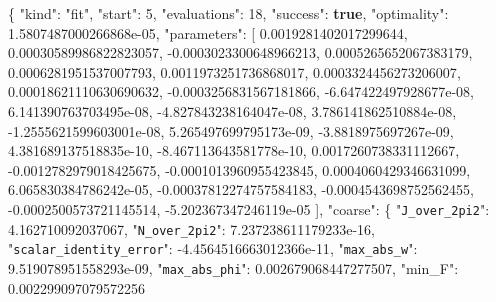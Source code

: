 \documentclass[
  10pt,
]{article}
\newenvironment{Shaded}{}{}
\newcommand{\DataTypeTok}[1]{\textcolor[rgb]{0.56,0.13,0.00}{#1}}
\newcommand{\DecValTok}[1]{\textcolor[rgb]{0.25,0.63,0.44}{#1}}
\newcommand{\FloatTok}[1]{\textcolor[rgb]{0.25,0.63,0.44}{#1}}
\newcommand{\FunctionTok}[1]{\textcolor[rgb]{0.02,0.16,0.49}{#1}}
\newcommand{\KeywordTok}[1]{\textcolor[rgb]{0.00,0.44,0.13}{\textbf{#1}}}
\newcommand{\OtherTok}[1]{\textcolor[rgb]{0.00,0.44,0.13}{#1}}
\newcommand{\StringTok}[1]{\textcolor[rgb]{0.25,0.44,0.63}{#1}}
\begin{document}
\begin{Shaded}
\begin{Highlighting}[]
\FunctionTok{\{}
  \DataTypeTok{"kind"}\FunctionTok{:} \StringTok{"fit"}\FunctionTok{,}
  \DataTypeTok{"start"}\FunctionTok{:} \DecValTok{5}\FunctionTok{,}
  \DataTypeTok{"evaluations"}\FunctionTok{:} \DecValTok{18}\FunctionTok{,}
  \DataTypeTok{"success"}\FunctionTok{:} \KeywordTok{true}\FunctionTok{,}
  \DataTypeTok{"optimality"}\FunctionTok{:} \FloatTok{1.5807487000266868e{-}05}\FunctionTok{,}
  \DataTypeTok{"parameters"}\FunctionTok{:} \OtherTok{[}
    \FloatTok{0.0019281402017299644}\OtherTok{,}
    \FloatTok{0.00030589986822823057}\OtherTok{,}
    \FloatTok{{-}0.0003023300648966213}\OtherTok{,}
    \FloatTok{0.0005265652067383179}\OtherTok{,}
    \FloatTok{0.0006281951537007793}\OtherTok{,}
    \FloatTok{0.0011973251736868017}\OtherTok{,}
    \FloatTok{0.0003324456273206007}\OtherTok{,}
    \FloatTok{0.00018621110630690632}\OtherTok{,}
    \FloatTok{{-}0.0003256831567181866}\OtherTok{,}
    \FloatTok{{-}6.647422497928677e{-}08}\OtherTok{,}
    \FloatTok{6.141390763703495e{-}08}\OtherTok{,}
    \FloatTok{{-}4.827843238164047e{-}08}\OtherTok{,}
    \FloatTok{3.786141862510884e{-}08}\OtherTok{,}
    \FloatTok{{-}1.2555621599603001e{-}08}\OtherTok{,}
    \FloatTok{5.265497699795173e{-}09}\OtherTok{,}
    \FloatTok{{-}3.8818975697267e{-}09}\OtherTok{,}
    \FloatTok{4.381689137518835e{-}10}\OtherTok{,}
    \FloatTok{{-}8.467113643581778e{-}10}\OtherTok{,}
    \FloatTok{0.0017260738331112667}\OtherTok{,}
    \FloatTok{{-}0.0012782979018425675}\OtherTok{,}
    \FloatTok{{-}0.0001013960955423845}\OtherTok{,}
    \FloatTok{0.0004060429346631099}\OtherTok{,}
    \FloatTok{6.065830384786242e{-}05}\OtherTok{,}
    \FloatTok{{-}0.00037812274757584183}\OtherTok{,}
    \FloatTok{{-}0.0004543698752562455}\OtherTok{,}
    \FloatTok{{-}0.0002500573721145514}\OtherTok{,}
    \FloatTok{{-}5.202367347246119e{-}05}
  \OtherTok{]}\FunctionTok{,}
  \DataTypeTok{"coarse"}\FunctionTok{:} \FunctionTok{\{}
    \DataTypeTok{"\nolinkurl{J_over_2pi2}"}\FunctionTok{:} \FloatTok{4.162710092037067}\FunctionTok{,}
    \DataTypeTok{"\nolinkurl{N_over_2pi2}"}\FunctionTok{:} \FloatTok{7.237238611179233e{-}16}\FunctionTok{,}
    \DataTypeTok{"\nolinkurl{scalar_identity_error}"}\FunctionTok{:} \FloatTok{{-}4.4564516663012366e{-}11}\FunctionTok{,}
    \DataTypeTok{"\nolinkurl{max_abs_w}"}\FunctionTok{:} \FloatTok{9.519078951558293e{-}09}\FunctionTok{,}
    \DataTypeTok{"\nolinkurl{max_abs_phi}"}\FunctionTok{:} \FloatTok{0.002679068447277507}\FunctionTok{,}
    \DataTypeTok{"min\_F"}\FunctionTok{:} \FloatTok{0.002299097079572256}

\end{Highlighting}
\end{Shaded}
\end{document}
